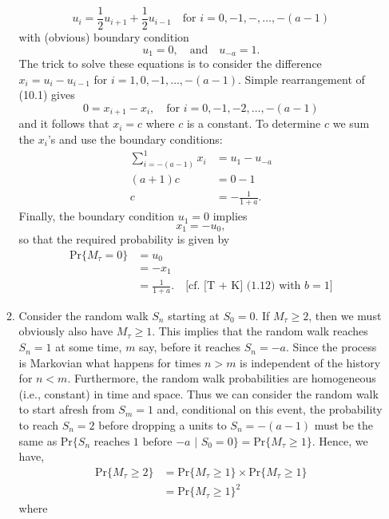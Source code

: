 \documentclass[11pt,a4paper]{article}
\begin{document}
\begin{enumerate}
\begin{enumerate}
\begin{equation}
        u_i = \frac{1}{2}u_{i + 1} + \frac{1}{2}u_{i - 1}\quad\text{for $i = 0, -1, -,\ldots,-(a - 1)$}
      \end{equation}
      with (obvious) boundary condition
      $$
      u_1 = 0,\quad\text{and}\quad u_{-a} = 1.
      $$
      The trick to solve these equations is to consider the difference $x_i = u_i - u_{i - 1}$ for $i = 1, 0, -1,\ldots,-(a - 1)$. Simple rearrangement of (10.1) gives
      $$
      0 = x_{i + 1} - x_i,\quad \text{for $i = 0, -1, -2,\ldots,-(a-1)$}
      $$
      and it follows that $x_i = c$ where $c$ is a constant. To determine $c$ we sum the $x_i$'s and use the boundary conditions:
      \begin{align*}
        \sum_{i = -(a - 1)}^1 x_i &= u_1 - u_{-a}\\
        (a + 1)c &= 0 - 1\\
        c &= -\frac{1}{1 + a}.
      \end{align*}
      Finally, the boundary condition $u_1 = 0$ implies
      $$
      x_1 = -u_0,
      $$
      so that the required probability is given by
      \begin{align*}
        \text{Pr}\{M_\tau = 0\}
        &= u_0\\
        &= -x_1\\
        &= \frac{1}{1 + a}.\quad\text{[cf. [T + K] (1.12) with $b = 1$]}
      \end{align*}
      \item Consider the random walk $S_n$ starting at $S_0 = 0$. If $M_\tau \geq 2$, then we must obviously also have $M_\tau \geq 1$. This implies that the random walk reaches $S_n = 1$ at some time, $m$ say, before it reaches $S_n = -a$. Since the process is Markovian what happens for times $n > m$ is independent of the history for $n < m$. Furthermore, the random walk probabilities are homogeneous (i.e., constant) in time and space. Thus we can consider the random walk to start afresh from $S_m = 1$ and, conditional on this event, the probability to reach $S_n = 2$ before dropping a units to $S_n = -(a - 1)$ must be the same as $\text{Pr}\{\text{$S_n$ reaches 1 before $-a$ | $S_0 = 0$}\} = \text{Pr}\{M_\tau \geq 1\}$. Hence, we have,
      \begin{align*}
        \text{Pr}\{M_\tau \geq 2\}
        &= \text{Pr}\{M_\tau \geq 1\}\times\text{Pr}\{M_\tau \geq 1\}\\
        &= \text{Pr}\{M_\tau \geq 1\}^2
      \end{align*}
      where
      \begin{align*}

\end{align*}
\end{enumerate}
\end{enumerate}
\end{document}
